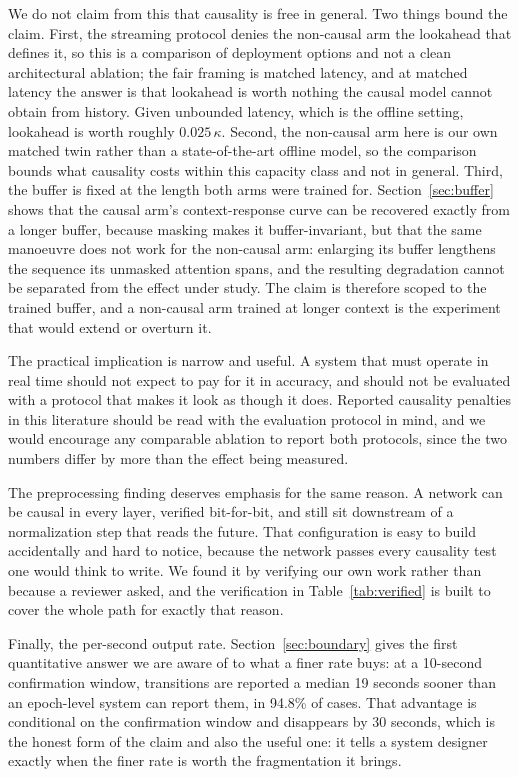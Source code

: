 \documentclass[conference]{IEEEtran}
\begin{document}
We do not claim from this that causality is free in general. Two things bound the claim. First, the streaming
protocol denies the non-causal arm the lookahead that defines it, so this is a comparison of deployment
options and not a clean architectural ablation; the fair framing is matched latency, and at matched latency
the answer is that lookahead is worth nothing the causal model cannot obtain from history. Given unbounded
latency, which is the offline setting, lookahead is worth roughly $0.025\,\kappa$. Second, the non-causal arm
here is our own matched twin rather than a state-of-the-art offline model, so the comparison bounds what
causality costs within this capacity class and not in general. Third, the buffer is fixed at the length both
arms were trained for. Section~\ref{sec:buffer} shows that the causal arm's context-response curve can be
recovered exactly from a longer buffer, because masking makes it buffer-invariant, but that the same
manoeuvre does not work for the non-causal arm: enlarging its buffer lengthens the sequence its unmasked
attention spans, and the resulting degradation cannot be separated from the effect under study. The claim is
therefore scoped to the trained buffer, and a non-causal arm trained at longer context is the experiment
that would extend or overturn it.

The practical implication is narrow and useful. A system that must operate in real time should not expect to
pay for it in accuracy, and should not be evaluated with a protocol that makes it look as though it does.
Reported causality penalties in this literature should be read with the evaluation protocol in mind, and we
would encourage any comparable ablation to report both protocols, since the two numbers differ by more than
the effect being measured.

The preprocessing finding deserves emphasis for the same reason. A network can be causal in every layer,
verified bit-for-bit, and still sit downstream of a normalization step that reads the future. That
configuration is easy to build accidentally and hard to notice, because the network passes every causality
test one would think to write. We found it by verifying our own work rather than because a reviewer asked, and
the verification in Table~\ref{tab:verified} is built to cover the whole path for exactly that reason.

Finally, the per-second output rate. Section~\ref{sec:boundary} gives the first quantitative answer we are
aware of to what a finer rate buys: at a 10-second confirmation window, transitions are reported a median 19
seconds sooner than an epoch-level system can report them, in 94.8\% of cases. That advantage is conditional
on the confirmation window and disappears by 30 seconds, which is the honest form of the claim and also the
useful one: it tells a system designer exactly when the finer rate is worth the fragmentation it brings.
\end{document}
